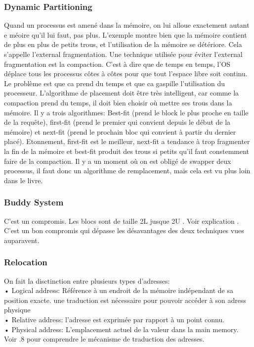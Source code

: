 \subsubsection{Dynamic Partitioning}
Quand un processus est amené dans la mémoire, on lui alloue exactement autant e méoire qu'il lui faut, pas plus.
L'exemple \cite[p.~314]{stallings} montre bien que la mémoire contient de plus en plus de petits trous, et l'utilisation de la mémoire se détériore.
Cela s'appelle l'external fragmentation.
Une technique utilisée pour éviter l'external fragmentation est la compaction.
C'est à dire que de temps en temps, l'OS déplace tous les processus côtes à côtes pour que tout l'espace libre soit continu.
Le problème est que ca prend du temps et que ca gaspille l'utilisation du processeur.
L'algorithme de placement doit être très intelligent, car comme la compaction prend du temps, il doit bien choisir où mettre ses trous dans la mémoire.
Il y a trois algorithmes: Best-fit (prend le block le plus proche en taille de la requête), first-fit (prend le premier qui convient depuis le début de la mémoire) et next-fit (prend le prochain bloc qui convient à partir du dernier placé).
Etonnement, first-fit est le meilleur, next-fit a tendance à trop fragmenter la fin de la mémoire et best-fit produit des trous si petits qu'il faut constemment faire de la compaction.
Il y a un moment où on est obligé de swapper deux processus, il faut donc un algorithme de remplacement, mais cela est vu plus loin dans le livre.
\subsubsection{Buddy System}
C'est un compromis.
Les blocs sont de taille 2L jusque 2U .
Voir explication \cite[p.~317]{stallings}.
C'est un bon compromis qui dépasse les désavantages des deux techniques vues auparavent.
\subsubsection{Relocation}
On fait la disctinction entre plusieurs types d'adresses: \\
• Logical address: Référence à un endroit de la mémoire indépendant de sa position exacte.
une traduction est nécessaire pour pouvoir accéder à son adress physique \\
• Relative address: l'adresse est exprimée par rapport à un point connu.
\\
• Physical address: L'emplacement actuel de la valeur dans la main memory.
Voir \cite[p.~7]{stallings}.8 pour comprendre le mécanisme de traduction des adresses.
